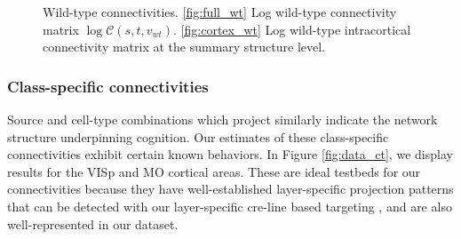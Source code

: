 \newpage

\begin{figure}[H]
\centering
        \newline
   \caption{Wild-type connectivities.
   \ref{fig:full_wt} Log wild-type connectivity matrix $\log \mathcal {C} (s,t,v_{wt})$.
   \ref{fig:cortex_wt} Log wild-type intracortical connectivity matrix at the summary structure level.}
   \label{fig:connectome}
\end{figure}

\newpage
\subsubsection{Class-specific connectivities}

Source and cell-type combinations which project similarly indicate the network structure underpinning cognition.
Our estimates of these class-specific connectivities exhibit certain known behaviors.
In Figure \ref{fig:data_ct}, we display results for the VISp and MO cortical areas.
These are ideal testbeds for our connectivities because they have well-established layer-specific projection patterns that can be detected with our layer-specific cre-line based targeting \citet{Jeong2016-dc}, and are also well-represented in our dataset.

